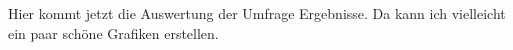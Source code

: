 \documentclass[../main.tex]{subfiles}
\begin{document}
Hier kommt jetzt die Auswertung der Umfrage Ergebnisse. Da kann ich vielleicht ein paar schöne Grafiken erstellen.
\end{document}
